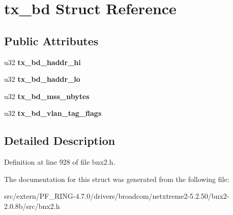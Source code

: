 \hypertarget{structtx__bd}{
\section{tx\_\-bd Struct Reference}
\label{structtx__bd}
}
\subsection*{Public Attributes}
\begin{DoxyCompactItemize}
\item 
\hypertarget{structtx__bd_a76ab2def077f50d9d284d75bdde6bc03}{
u32 {\bfseries tx\_\-bd\_\-haddr\_\-hi}}
\label{structtx__bd_a76ab2def077f50d9d284d75bdde6bc03}

\item 
\hypertarget{structtx__bd_a6730fbbedf0329baa7f7f6c51049797c}{
u32 {\bfseries tx\_\-bd\_\-haddr\_\-lo}}
\label{structtx__bd_a6730fbbedf0329baa7f7f6c51049797c}

\item 
\hypertarget{structtx__bd_a9bd99943198df867290a2666c554d5d7}{
u32 {\bfseries tx\_\-bd\_\-mss\_\-nbytes}}
\label{structtx__bd_a9bd99943198df867290a2666c554d5d7}

\item 
\hypertarget{structtx__bd_a42610dca2aced868420f2e7a6229802c}{
u32 {\bfseries tx\_\-bd\_\-vlan\_\-tag\_\-flags}}
\label{structtx__bd_a42610dca2aced868420f2e7a6229802c}

\end{DoxyCompactItemize}


\subsection{Detailed Description}


Definition at line 928 of file bnx2.h.



The documentation for this struct was generated from the following file:\begin{DoxyCompactItemize}
\item 
src/extern/PF\_\-RING-\/4.7.0/drivers/broadcom/netxtreme2-\/5.2.50/bnx2-\/2.0.8b/src/bnx2.h\end{DoxyCompactItemize}
